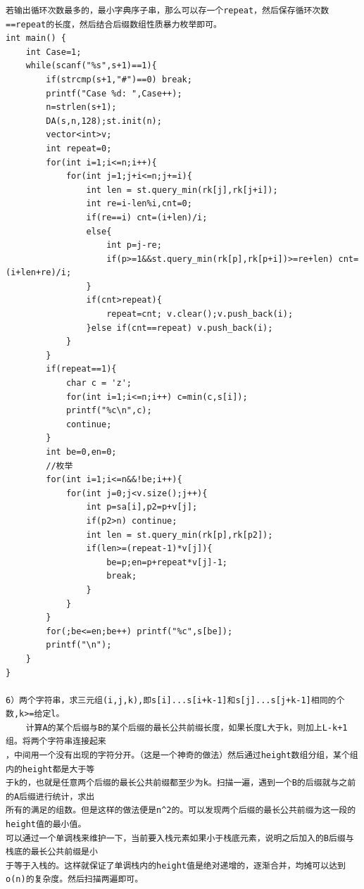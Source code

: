 \documentclass[twoside]{article}
\begin{document}
\begin{lstlisting}
若输出循环次数最多的，最小字典序子串，那么可以存一个repeat，然后保存循环次数==repeat的长度，然后结合后缀数组性质暴力枚举即可。
int main() {
    int Case=1;
    while(scanf("%s",s+1)==1){
        if(strcmp(s+1,"#")==0) break;
        printf("Case %d: ",Case++);
        n=strlen(s+1);
        DA(s,n,128);st.init(n);
        vector<int>v;
        int repeat=0;
        for(int i=1;i<=n;i++){
            for(int j=1;j+i<=n;j+=i){
                int len = st.query_min(rk[j],rk[j+i]);
                int re=i-len%i,cnt=0;
                if(re==i) cnt=(i+len)/i;
                else{
                    int p=j-re;
                    if(p>=1&&st.query_min(rk[p],rk[p+i])>=re+len) cnt=(i+len+re)/i;
                }
                if(cnt>repeat){
                    repeat=cnt; v.clear();v.push_back(i);
                }else if(cnt==repeat) v.push_back(i);
            }
        }
        if(repeat==1){
            char c = 'z';
            for(int i=1;i<=n;i++) c=min(c,s[i]);
            printf("%c\n",c);
            continue;
        }
        int be=0,en=0;
		//枚举
        for(int i=1;i<=n&&!be;i++){
            for(int j=0;j<v.size();j++){
                int p=sa[i],p2=p+v[j];
                if(p2>n) continue;
                int len = st.query_min(rk[p],rk[p2]);
                if(len>=(repeat-1)*v[j]){
                    be=p;en=p+repeat*v[j]-1;
                    break;
                }
            }
        }
        for(;be<=en;be++) printf("%c",s[be]);
        printf("\n");
    }
}

6）两个字符串，求三元组(i,j,k),即s[i]...s[i+k-1]和s[j]...s[j+k-1]相同的个数,k>=给定l。
	计算A的某个后缀与B的某个后缀的最长公共前缀长度，如果长度L大于k，则加上L-k+1组。将两个字符串连接起来
，中间用一个没有出现的字符分开。（这是一个神奇的做法）然后通过height数组分组，某个组内的height都是大于等
于k的，也就是任意两个后缀的最长公共前缀都至少为k。扫描一遍，遇到一个B的后缀就与之前的A后缀进行统计，求出
所有的满足的组数。但是这样的做法便是n^2的。可以发现两个后缀的最长公共前缀为这一段的height值的最小值。
可以通过一个单调栈来维护一下，当前要入栈元素如果小于栈底元素，说明之后加入的B后缀与栈底的最长公共前缀是小
于等于入栈的。这样就保证了单调栈内的height值是绝对递增的，逐渐合并，均摊可以达到o(n)的复杂度。然后扫描两遍即可。


\end{lstlisting}
\end{document}
